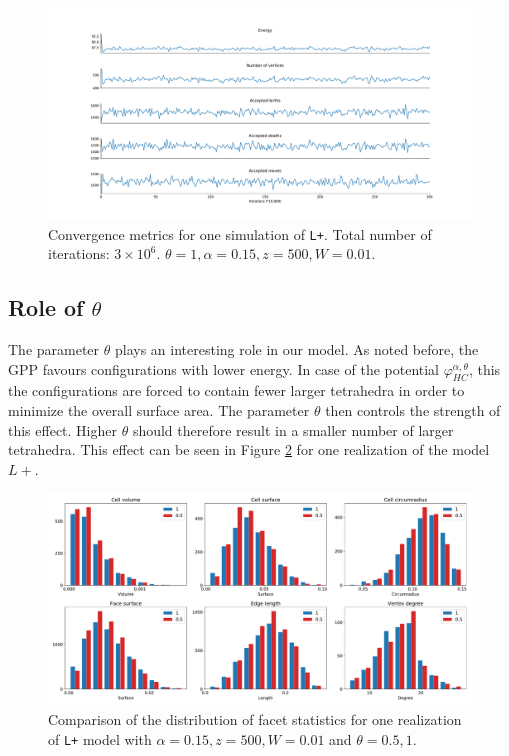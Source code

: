 \begin{figure}
	\hspace{-2.7cm}
  \includegraphics[width=1.3\textwidth]{../img/numeric/convergence.pdf}
  \caption{Convergence metrics for one simulation of \texttt{L+}. Total number of iterations: $3\times 10^6$. $\theta = 1, \alpha = 0.15, z = 500, W = 0.01$.}
  \label{fig:convergence}
\end{figure}




\subsection{Role of $\theta$}
The parameter $\theta$ plays an interesting role in our model. As noted before, the GPP favours configurations with lower energy. In case of the potential $\varphi^{\alpha,\theta}_{HC}$, this the configurations are forced to contain fewer larger tetrahedra in order to minimize the overall surface area. The parameter $\theta$ then controls the strength of this effect. Higher $\theta$ should therefore result in a smaller number of larger tetrahedra. This effect can be seen in Figure \ref{fig:thetaeffect} for one realization of the model $L+$.

\begin{figure}
  \centering
  \includegraphics[width=1\textwidth]{../img/numeric/facets_1_05.pdf}
  \caption{Comparison of the distribution of facet statistics for one realization of \texttt{L+} model with $\alpha=0.15,z=500,W=0.01$ and $\theta = 0.5,1$.  }
  \label{fig:thetaeffect}
\end{figure}



